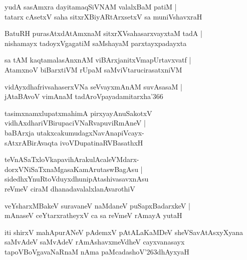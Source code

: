 \documentclass[twoside,12pt,openright]{book}
\def\S{\char'263}
\newcounter{shloka}[chapter]
\begin{document}
\begin{shloka}%
yudA sasAmxra dayitamaqSiVNAM  valalxBaM patiM |\\
tatarx cAsetxV saha sitxrXBiyARtArxsetxV sa muniVshavxraH 
\end{shloka}

\begin{shloka}%
BatuRH purasAtxdAtAmxnaM sitxrXVsahasarxvayxtaM tadA |\\
nishamayx tadoyxVgagatiM saMshayaM parxtayxpadayxta
\end{shloka}

\begin{shloka}%
sa tAM kaqtamalasAnxnAM viBArxjanitxVmapUrtavxvatf |\\
AtamxnoV biBarxtiVM rUpaM saMviVtarucirasatxniVM 
\end{shloka}

\begin{shloka}%
vidAyxdhafrivsahaserxVNa seVvayxmAnAM suvAsasaM |\\
jAtaBAvoV vimAnaM tadAroVpayadamitarxha\char'366
\end{shloka}

\begin{shloka}%
tasimxnamxlupatxmahimA pirxyayAnuSakotxV \\
vidhAxdhariVBirupaciVNaRvapuviRmAneV |\\
baBArxja utakxcakumudagxNavAnapiVcayx-\\
sAtxrABirAvaqta ivoVDupatinaRVBasathxH
\end{shloka}

\begin{shloka}%
teVnASaTxloVkapavihArakulAcaleVMdarx-\\
dorxVNiSaTxnaMgasaKamArutaswBagAsu |\\
sidedhxYnuRtoVduyxdhunipAtashivasavxnAsu \\
reVmeV ciraM dhanadavalalxlanAvarothiV 
\end{shloka}

\begin{shloka}%
veYsharxMBakeV suravaneV naMdaneV puSapxBadarxkeV |\\
mAnaseV ceYtarxratheyxV ca sa reVmeV rAmayA yutaH 
\end{shloka}

\begin{center}
iti shirxV mahApurANeV pAdemxV pAtALaKaMDeV sheVSavAtAsxyXyana saMvAdeV 
saMvAdeV rAmAshavxmeVdheV cayxvanasayx tapoVBoVgavaNaRnaM nAma paMcadashoV\S dhAyxyaH
\end{center}
\end{document}
